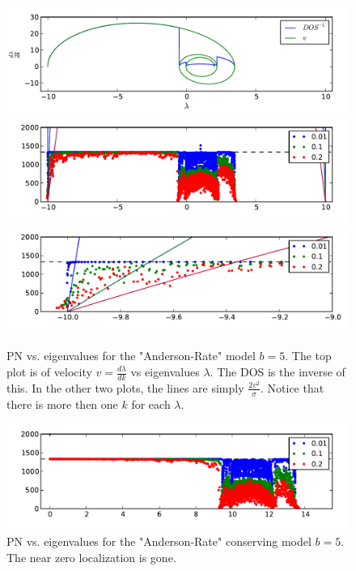 \documentclass[onecolumn,fleqn,longbibliography]{revtex4}
\begin{document}
\begin{figure}[H]
\includegraphics{pta_theor_banded_dos}
\includegraphics{pta_anderson_rates_b5}\\
\includegraphics{pta_anderson_rates_b5_zoom}
\caption{PN vs. eigenvalues for the "Anderson-Rate" model $b=5$.
 The top plot is of velocity $v=\frac{d\lambda}{dk}$ vs eigenvalues $\lambda$. The DOS is the inverse of this.
In the other two plots, the lines are simply $\frac{2 v^2}{\sigma}$. Notice that
there is more then one $k$ for each $\lambda$. 
}\label{fig:anderson_rate_b5}
\end{figure}

\begin{figure}[H]
\includegraphics{pta_anderson_rates_conserv_b5}
\caption{PN vs. eigenvalues for the "Anderson-Rate" conserving model $b=5$.
The near zero localization is gone.
}\label{fig:anderson_rate_conserv_b5}
\end{figure}











\end{document}
